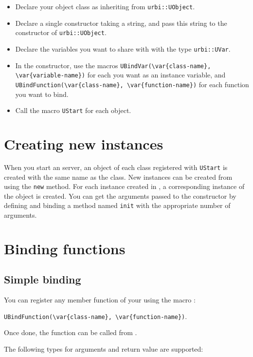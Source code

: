 \begin{itemize}
\item Declare your object class as inheriting from
  \lstinline{urbi::UObject}.
\item Declare a single constructor taking a string, and pass this
  string to the constructor of \lstinline{urbi::UObject}.
\item Declare the variables you want to share with \urbi with the type
  \lstinline{urbi::UVar}.
\item In the constructor, use the macros
  \lstinline|UBindVar(\var{class-name}, \var{variable-name})|
  for each \UVar you want as an instance variable, and
  \lstinline|UBindFunction(\var{class-name}, \var{function-name})| for
  each function you want to bind.
\item Call the macro \lstinline{UStart} for each object.
\end{itemize}

\section{Creating new instances}

When you start an \urbi server, an object of each class registered
with \lstinline{UStart} is created with the same name as the
class. New instances can be created from \urbi using the
\lstinline|new| method. For each instance created in \urbi, a
corresponding instance of the \Cxx object is created. You can get the
arguments passed to the constructor by defining and binding a method
named \lstinline|init| with the appropriate number of arguments.

\section{Binding functions}

\subsection{Simple binding}
\label{sec:uobject:simple-binding}
You can register any member function of your \UObject using the macro
:

\lstinline|UBindFunction(\var{class-name}, \var{function-name})|.

Once done, the function can be called from \us.

The following types for arguments and return value are supported:

